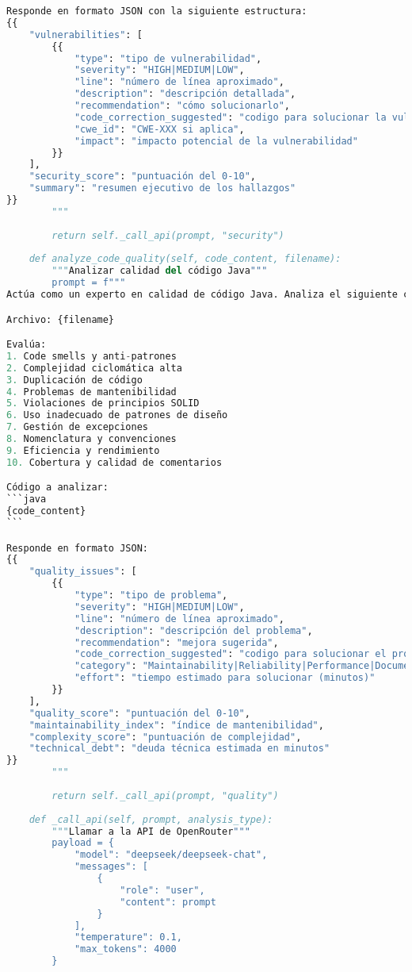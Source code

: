 \begin{lstlisting}[language=python, caption={Contenido completo del script ai\_analyzer.py.}, label={lst:python_script}]
Responde en formato JSON con la siguiente estructura:
{{
    "vulnerabilities": [
        {{
            "type": "tipo de vulnerabilidad",
            "severity": "HIGH|MEDIUM|LOW",
            "line": "número de línea aproximado",
            "description": "descripción detallada",
            "recommendation": "cómo solucionarlo",
            "code_correction_suggested": "codigo para solucionar la vulnerabilidad",
            "cwe_id": "CWE-XXX si aplica",
            "impact": "impacto potencial de la vulnerabilidad"
        }}
    ],
    "security_score": "puntuación del 0-10",
    "summary": "resumen ejecutivo de los hallazgos"
}}
        """
        
        return self._call_api(prompt, "security")
    
    def analyze_code_quality(self, code_content, filename):
        """Analizar calidad del código Java"""
        prompt = f"""
Actúa como un experto en calidad de código Java. Analiza el siguiente código para identificar problemas de calidad:

Archivo: {filename}

Evalúa:
1. Code smells y anti-patrones
2. Complejidad ciclomática alta
3. Duplicación de código
4. Problemas de mantenibilidad
5. Violaciones de principios SOLID
6. Uso inadecuado de patrones de diseño
7. Gestión de excepciones
8. Nomenclatura y convenciones
9. Eficiencia y rendimiento
10. Cobertura y calidad de comentarios

Código a analizar:
```java
{code_content}
```

Responde en formato JSON:
{{
    "quality_issues": [
        {{
            "type": "tipo de problema",
            "severity": "HIGH|MEDIUM|LOW",
            "line": "número de línea aproximado",
            "description": "descripción del problema",
            "recommendation": "mejora sugerida",
            "code_correction_suggested": "codigo para solucionar el problema",
            "category": "Maintainability|Reliability|Performance|Documentation",
            "effort": "tiempo estimado para solucionar (minutos)"
        }}
    ],
    "quality_score": "puntuación del 0-10",
    "maintainability_index": "índice de mantenibilidad",
    "complexity_score": "puntuación de complejidad",
    "technical_debt": "deuda técnica estimada en minutos"
}}
        """
        
        return self._call_api(prompt, "quality")
    
    def _call_api(self, prompt, analysis_type):
        """Llamar a la API de OpenRouter"""
        payload = {
            "model": "deepseek/deepseek-chat",
            "messages": [
                {
                    "role": "user", 
                    "content": prompt
                }
            ],
            "temperature": 0.1,
            "max_tokens": 4000
        }
        

\end{lstlisting}
